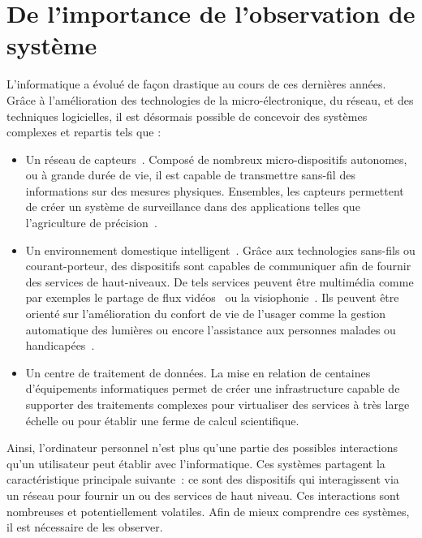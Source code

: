 \section{De l'importance de l'observation de système}\label{sec:intro:contexte}
L'informatique a évolué de façon drastique au cours de ces dernières années. Grâce à l'amélioration des technologies de la micro-électronique, du réseau, et des techniques logicielles, il est désormais possible de concevoir des systèmes complexes et repartis tels que :
\begin{itemize}
 \item Un réseau de capteurs~\cite{Akyildiz:wsn,Szewczyk:monitoring}. Composé de nombreux micro-dispositifs autonomes, ou à grande durée de vie, il est capable de transmettre sans-fil des informations sur des mesures physiques. Ensembles, les capteurs permettent de créer un système de surveillance dans des applications telles que l'agriculture de précision~\cite{Jurdak:sumac}.
 \item Un environnement domestique intelligent~\cite{Harper:smarthome, Chan:smarthome, Coyle:assisted}. Grâce aux technologies sans-fils ou courant-porteur, des dispositifs sont capables de communiquer afin de fournir des services de haut-niveaux. De tels services peuvent être multimédia comme par exemples le partage de flux vidéos~\cite{Kang:upnpav} ou la visiophonie~\cite{Vilei:videophone}. Ils peuvent être orienté sur l'amélioration du confort de vie de l'usager comme la gestion automatique des lumières ou encore l'assistance aux personnes malades ou handicapées~\cite{Korhonen:health}.
 \item Un centre de traitement de données. La mise en relation de centaines d'équipements informatiques permet de créer une infrastructure capable de supporter des traitements complexes pour virtualiser des services à très large échelle ou pour établir une ferme de calcul scientifique.
\end{itemize}

Ainsi, l'ordinateur personnel n'est plus qu'une partie des possibles interactions qu'un utilisateur peut établir avec l'informatique. Ces systèmes partagent la caractéristique principale suivante~: ce sont des dispositifs qui interagissent via un réseau pour fournir un ou des services de haut niveau. Ces interactions sont nombreuses et potentiellement volatiles. Afin de mieux comprendre ces systèmes, il est nécessaire de les observer.

